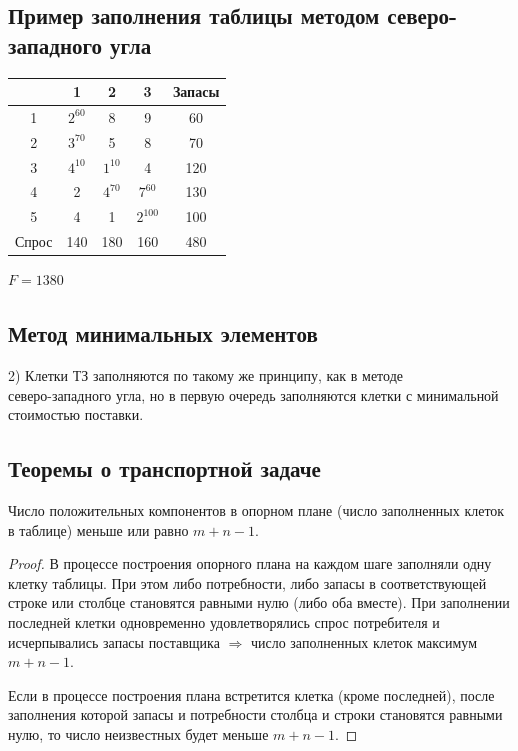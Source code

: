 \documentclass[17pt]{extarticle}
\begin{document}
\subsection{Пример заполнения таблицы методом северо-западного угла}
\begin{center}
    \begin{tabular}{|c|c|c|c|c|}
        \hline
              & 1            & 2            & 3             & Запасы \\
        \hline
        1     & \( 2^{60} \) & 8            & 9             & 60     \\
        \hline
        2     & \( 3^{70} \) & 5            & 8             & 70     \\
        \hline
        3     & \( 4^{10} \) & \( 1^{10} \) & 4             & 120    \\
        \hline
        4     & 2            & \( 4^{70} \) & \( 7^{60} \)  & 130    \\
        \hline
        5     & 4            & 1            & \( 2^{100} \) & 100    \\
        \hline
        Спрос & 140          & 180          & 160           & 480    \\
        \hline
    \end{tabular} $F=1380$
\end{center}

\subsection{Метод минимальных элементов}
2) Клетки ТЗ заполняются по такому же принципу, как в методе \\ северо-западного угла,
но в первую очередь заполняются клетки с минимальной стоимостью поставки.

\subsection{Теоремы о транспортной задаче}
\begin{theorem}
    Число положительных компонентов в опорном плане (число заполненных клеток в таблице) меньше или равно \( m + n - 1 \).
\end{theorem}

\begin{proof}
    В процессе построения опорного плана на каждом шаге заполняли одну клетку таблицы. При этом либо потребности, либо запасы в соответствующей строке или столбце становятся равными нулю (либо оба вместе). При заполнении последней клетки одновременно удовлетворялись спрос потребителя и исчерпывались запасы поставщика \(\Rightarrow\) число заполненных клеток максимум \( m + n - 1 \).

    Если в процессе построения плана встретится клетка (кроме последней), после заполнения которой запасы и потребности столбца и строки становятся равными нулю, то число неизвестных будет меньше \( m + n - 1 \).
\end{proof}
\end{document}
